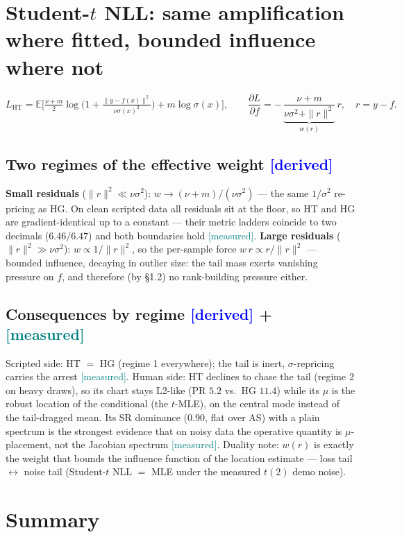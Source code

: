 \documentclass[10pt]{article}
\newcommand{\tagd}{{\small\textcolor{blue}{[derived]}}}
\newcommand{\tagm}{{\small\textcolor{teal}{[measured]}}}
\begin{document}
\section{Student-$t$ NLL: same amplification where fitted, bounded influence
where not}

\begin{equation}
L_{\mathrm{HT}} = \mathbb{E}\Big[\tfrac{\nu+m}{2}
\log\Big(1+\tfrac{\|y-f(x)\|^{2}}{\nu\sigma(x)^{2}}\Big)+m\log\sigma(x)\Big],
\qquad
\frac{\partial L}{\partial f} = -\,\underbrace{\frac{\nu+m}{\nu\sigma^{2}
+\|r\|^{2}}}_{w(r)}\,r,\quad r=y-f.
\end{equation}

\subsection{Two regimes of the effective weight \hfill \tagd}
\textbf{Small residuals} ($\|r\|^{2}\ll\nu\sigma^{2}$):
$w \to (\nu+m)/(\nu\sigma^{2})$ --- the same $1/\sigma^{2}$ re-pricing as HG.
On clean scripted data all residuals sit at the floor, so HT and HG are
gradient-identical up to a constant --- their metric ladders coincide to two
decimals ($6.46/6.47$) and both boundaries hold \tagm.
\textbf{Large residuals} ($\|r\|^{2}\gg\nu\sigma^{2}$):
$w \propto 1/\|r\|^{2}$, so the per-sample force $w\,r \propto r/\|r\|^{2}$
--- bounded influence, decaying in outlier size: the tail mass exerts
vanishing pressure on $f$, and therefore (by \S1.2) no rank-building pressure
either.

\subsection{Consequences by regime \hfill \tagd{} + \tagm}
Scripted side: HT $=$ HG (regime 1 everywhere); the tail is inert,
$\sigma$-repricing carries the arrest \tagm. Human side: HT declines to chase
the tail (regime 2 on heavy draws), so its chart stays L2-like (PR $5.2$ vs.\
HG $11.4$) while its $\mu$ is the robust location of the conditional (the
$t$-MLE), on the central mode instead of the tail-dragged mean. Its SR
dominance ($0.90$, flat over AS) with a plain spectrum is the strongest
evidence that on noisy data the operative quantity is $\mu$-placement, not
the Jacobian spectrum \tagm. Duality note: $w(r)$ is exactly the weight that
bounds the influence function of the location estimate --- loss tail
$\leftrightarrow$ noise tail (Student-$t$ NLL $=$ MLE under the measured
$t(2)$ demo noise).

\section{Summary}
\end{document}

